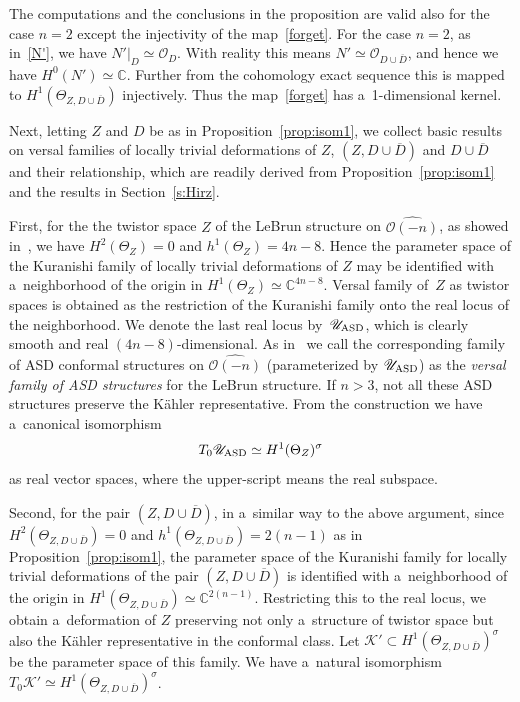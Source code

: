 \begin{Remark}
The computations and the conclusions in the proposition are valid also for the case $n=2$ except the injectivity of the
map~\eqref{forget}.
For the case $n=2$, as in~\eqref{N'}, we have $N'|_D\simeq \mathscr O_D$.
With reality this means $N'\simeq \mathscr O_{D\cup\overline D}$, and hence we have $H^0(N')\simeq\mathbb{C}$.
Further from the cohomology exact sequence this is mapped to $H^1(\Theta_{Z,D\cup \overline D})$ injectively.
Thus the map~\eqref{forget} has a~1-dimensional kernel.
\end{Remark}

Next, letting $Z$ and $D$ be as in Proposition~\ref{prop:isom1}, we collect basic results on versal families of locally
trivial deformations of $Z$, $(Z,D\cup\overline D)$ and $D\cup \overline D$ and their relationship, which are readily
derived from Proposition~\ref{prop:isom1} and the results in Section~\ref{s:Hirz}.

First, for the the twistor space $Z$ of the LeBrun structure on $\widehat{\mathscr O(-n)}$, as showed
in~\cite[Proposition~2.1]{HonCMP2}, we have $H^2(\Theta_Z)=0$ and $h^1(\Theta_Z)=4n-8$.
Hence the parameter space of the Kuranishi family of locally trivial deformations of $Z$ may be identif\/ied with
a~neighborhood of the origin in $H^1(\Theta_Z)\simeq\mathbb{C}^{4n-8}$.
Versal family of~$Z$ as twistor spaces is obtained as the restriction of the Kuranishi family onto the real locus of the
neighborhood.
We denote the last real locus by~$\mathscr U_{\rm{ASD}}$, which is clearly smooth and real $(4n-8)$-dimensional.
As in~\cite{HonCMP2} we call the corresponding family of ASD conformal structures on $\widehat{\mathscr O(-n)}$
(parameterized by $\mathscr U_{\rm{ASD}}$) as the {\em versal family of ASD structures} for the LeBrun structure.
If $n>3$, not all these ASD structures preserve the K\"ahler representative.
From the construction we have a~canonical isomorphism
\begin{gather*}%
T_0\mathscr U_{\rm{ASD}}\simeq H^1(\Theta_Z)^{\sigma}
\end{gather*}
as real vector spaces, where the upper-script means the real subspace.

Second, for the pair $(Z,D\cup\overline D)$, in a~similar way to the above argument, since $ H^2 (\Theta_{Z,  D \cup
\overline D} ) =0$ and $ h^1 (\Theta_{Z,  D \cup \overline D} ) =2(n-1)$ as in Proposition~\ref{prop:isom1}, the
parameter space of the Kuranishi family for locally trivial deformations of the pair $(Z,D\cup\overline D)$ is
identif\/ied with a~neighborhood of the origin in $H^1 (\Theta_{Z, D \cup \overline D} ) \simeq\mathbb{C}^{2(n-1)}$.
Restricting this to the real locus, we obtain a~deformation of $Z$ preserving not only a~structure of twistor space but
also the K\"ahler representative in the conformal class.
Let $\mathscr K'\subset H^1(\Theta_{Z,D\cup\overline D})^{\sigma}$ be the parameter space of this family.
We have a~natural isomorphism $ T_0\mathscr K'\simeq H^1(\Theta_{Z,D\cup\overline D})^{\sigma} $.

